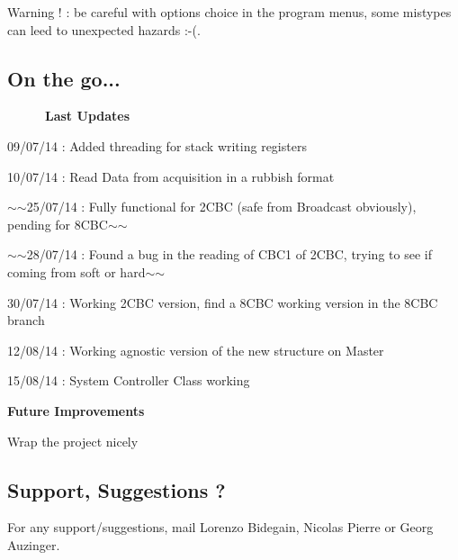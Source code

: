 Warning ! \-: be careful with options choice in the program menus, some mistypes can leed to unexpected hazards \-:-\/(.

\subsection*{On the go... }

~~~~~~{\bfseries Last Updates}


\begin{DoxyItemize}
\item 09/07/14 \-: Added threading for stack writing registers
\item 10/07/14 \-: Read Data from acquisition in a rubbish format
\item $\sim$$\sim$25/07/14 \-: Fully functional for 2\-C\-B\-C (safe from Broadcast obviously), pending for 8\-C\-B\-C$\sim$$\sim$
\item $\sim$$\sim$28/07/14 \-: Found a bug in the reading of C\-B\-C1 of 2\-C\-B\-C, trying to see if coming from soft or hard$\sim$$\sim$
\item 30/07/14 \-: Working 2\-C\-B\-C version, find a 8\-C\-B\-C working version in the 8\-C\-B\-C branch
\item 12/08/14 \-: Working agnostic version of the new structure on Master
\item 15/08/14 \-: System Controller Class working \par
 \par
 {\bfseries Future Improvements}
\item Wrap the project nicely
\end{DoxyItemize}

\subsection*{Support, Suggestions ? }

For any support/suggestions, mail Lorenzo Bidegain, Nicolas Pierre or Georg Auzinger. 